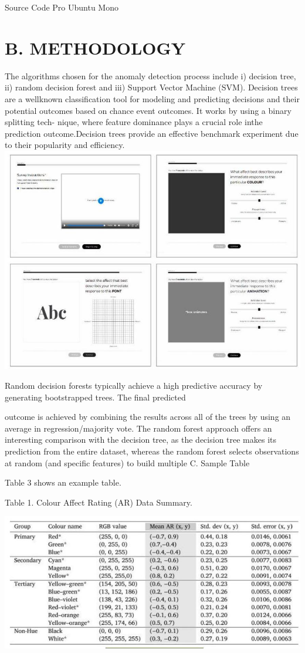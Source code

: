 \documentclass[10pt]{article}
\begin{document}
Source Code Pro Ubuntu Mono

\section{B. METHODOLOGY}
The algorithms chosen for the anomaly detection process include i) decision tree, ii) random decision forest and iii) Support Vector Machine (SVM). Decision trees are a wellknown classification tool for modeling and predicting decisions and their potential outcomes based on chance event outcomes. It works by using a binary splitting tech- nique, where feature dominance plays a crucial role inthe prediction outcome.Decision trees provide an effective benchmark experiment due to their popularity and efficiency.
\includegraphics[max width=\textwidth, center]{2023_01_16_edd5388a973e00ef26e3g-2(4)}

Random decision forests typically achieve a high predictive accuracy by generating bootstrapped trees. The final predicted

outcome is achieved by combining the results across all of the trees by using an average in regression/majority vote. The random forest approach offers an interesting comparison with the decision tree, as the decision tree makes its prediction from the entire dataset, whereas the random forest selects observations at random (and specific features) to build multiple C. Sample Table

Table 3 shows an example table.

Table 1. Colour Affect Rating (AR) Data Summary.

\begin{center}
\includegraphics[max width=\textwidth]{2023_01_16_edd5388a973e00ef26e3g-2(5)}
\end{center}
\end{document}
